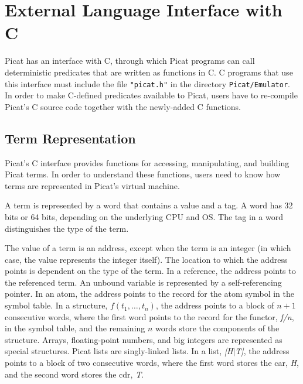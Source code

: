 \chapter{\label{ch:cinterface}External Language Interface with C}
Picat has an interface with C, through which Picat programs can call deterministic predicates that are written as functions in C. C programs that use this interface must include the file \texttt{"picat.h"} in the directory \texttt{Picat/Emulator}. In order to make C-defined predicates available to Picat, users have to re-compile Picat's C source code together with the newly-added C functions.


\section{Term Representation}
Picat's C interface provides functions for accessing, manipulating, and building Picat terms. In order to understand these functions, users need to know how terms are represented in Picat's virtual machine.

A term is represented by a word that contains a value and a tag. A word has 32 bits or 64 bits, depending on the underlying CPU and OS. The tag in a word distinguishes the type of the term. 

The value of a term is an address, except when the term is an integer (in which case, the value represents the integer itself).  The location to which the address points is dependent on the type of the term.  In a reference, the address points to the referenced term. An unbound variable is represented by a self-referencing pointer. In an atom, the address points to the record for the atom symbol in the symbol table.  In a structure, $f(t_1,\ldots,t_n)$, the address points to a block of $n+1$ consecutive words, where the first word points to the record for the functor, \emph{f/n}, in the symbol table, and the remaining $n$ words store the components of the structure. Arrays, floating-point numbers, and big integers are represented as special structures. Picat lists are singly-linked lists. In a list, \emph{[H$|$T]}, the address points to a block of two consecutive words, where the first word stores the car, \emph{H}, and the second word stores the cdr, \emph{T}. 

